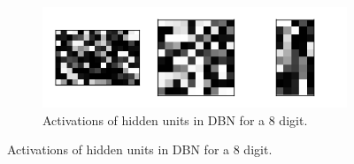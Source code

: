 \documentclass{article}
\begin{document}
\begin{figure}[!ht]
\begin{subfigure}[t]{0.47\textwidth}
  \end{subfigure}
  ~
  \begin{subfigure}[t]{0.47\textwidth}
    \centering
    \includegraphics[width=\textwidth]{../plots/3_2_2/dbn_d8_activations.png}
    \caption{Activations of hidden units in DBN for a 8 digit.}
  \end{subfigure}
\end{figure}
\end{document}
